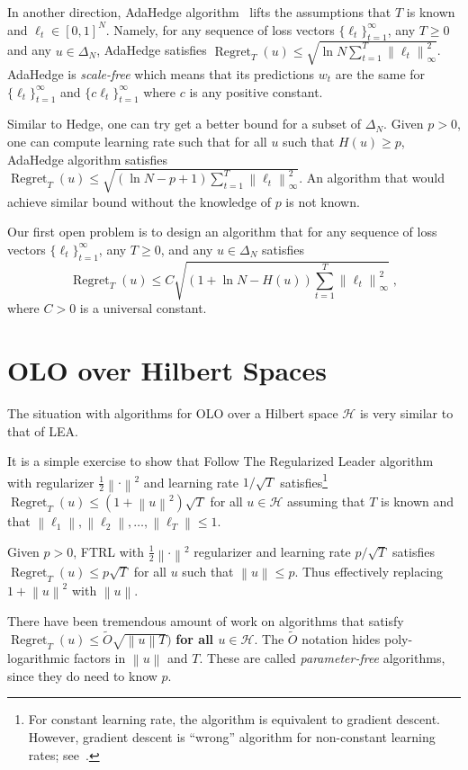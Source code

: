 \documentclass{colt2016} %
\DeclareMathOperator{\Regret}{Regret}
\renewcommand{\H}{\mathcal{H}}  %
\newcommand{\norm}[1]{\left\|{#1}\right\|}
\begin{document}
In another direction, AdaHedge
algorithm~\citep{de-Rooij-van-Erven-Grunwald-Koolen-2014} lifts the assumptions
that $T$ is known and $\ell_t \in [0,1]^N$. Namely, for any sequence of loss
vectors $\{\ell_t\}_{t=1}^\infty$, any $T \ge 0$ and any $u \in \Delta_N$,
AdaHedge satisfies $\Regret_T(u) \le \sqrt{\ln N \sum_{t=1}^T
\norm{\ell_t}_\infty^2}$. AdaHedge is \emph{scale-free} which means that its
predictions $w_t$ are the same for $\{\ell_t\}_{t=1}^\infty$ and $\{c
\ell_t\}_{t=1}^\infty$ where $c$ is any positive constant.

Similar to Hedge, one can try get a better bound for a subset of $\Delta_N$.
Given $p > 0$, one can compute learning rate such that for all $u$ such that
$H(u) \ge p$, AdaHedge algorithm satisfies $\Regret_T(u) \le \sqrt{(\ln N - p +
1) \sum_{t=1}^T \norm{\ell_t}_\infty^2}$. An algorithm that would achieve
similar bound without the knowledge of $p$ is not known.

Our first open problem is to design an algorithm that for any
sequence of loss vectors $\{\ell_t\}_{t=1}^\infty$, any $T \ge 0$,
and any $u \in \Delta_N$ satisfies
$$
\Regret_T(u) \le C \sqrt{(1 + \ln N - H(u)) \sum_{t=1}^T \norm{\ell_t}_\infty^2} \; ,
$$
where $C > 0$ is a universal constant.

\section{OLO over Hilbert Spaces}

The situation with algorithms for OLO over a Hilbert space $\H$ is very similar
to that of LEA.

It is a simple exercise to show that Follow The Regularized Leader algorithm
with regularizer $\frac{1}{2}\norm{\cdot}^2$ and learning rate $1/\sqrt{T}$
satisfies\footnote{For constant learning rate, the algorithm is equivalent to
gradient descent. However, gradient descent is ``wrong'' algorithm for
non-constant learning rates; see~\cite{Orabona-Pal-2016-scale-free}.}
$\Regret_T(u) \le (1 + \norm{u}^2) \sqrt{T}$ for all $u \in \H$ assuming that
$T$ is known and that $\norm{\ell_1}, \norm{\ell_2}, \dots, \norm{\ell_T} \le
1$.

Given $p > 0$, FTRL with $\frac{1}{2}\norm{\cdot}^2$ regularizer and learning
rate $p/\sqrt{T}$ satisfies $\Regret_T(u) \le p \sqrt{T}$ for all $u$ such that
$\norm{u} \le p$. Thus effectively replacing $1 + \norm{u}^2$ with $\norm{u}$.

There have been tremendous amount of work
\citep{Streeter-McMahan-2012,Orabona-2013,McMahan-Abernethy-2013,McMahan-Orabona-2014}
on algorithms that satisfy $\Regret_T(u) \le \widetilde O\sqrt{\norm{u} T})$
\textbf{for all $u \in \H$}. The $\widetilde O$ notation hides poly-logarithmic
factors in $\norm{u}$ and $T$. These are called \emph{parameter-free}
algorithms, since they do need to know $p$.
\end{document}
